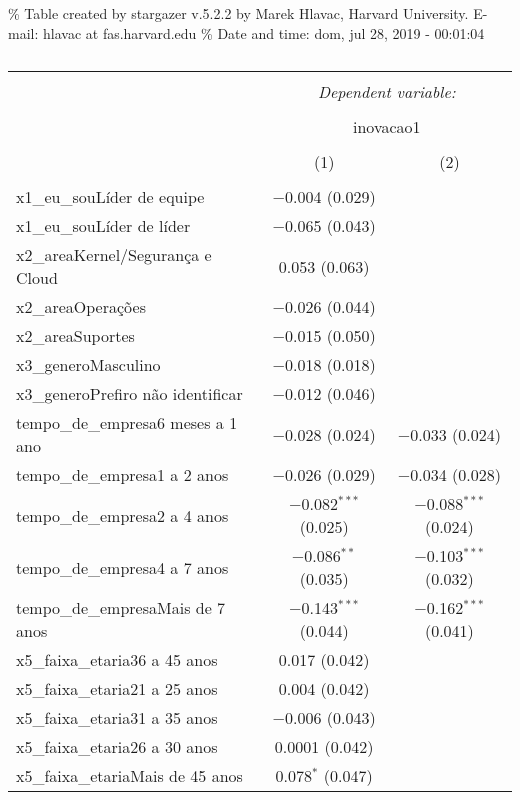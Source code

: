 \documentclass[]{book}
\begin{document}
\% Table created by stargazer v.5.2.2 by Marek Hlavac, Harvard University. E-mail: hlavac at fas.harvard.edu
\% Date and time: dom, jul 28, 2019 - 00:01:04

\begin{table}[!htbp] \centering 
  \caption{} 
  \label{} 
\begin{tabular}{@{\extracolsep{5pt}}lcc} 
\\[-1.8ex]\hline 
\hline \\[-1.8ex] 
 & \multicolumn{2}{c}{\textit{Dependent variable:}} \\ 
\cline{2-3} 
\\[-1.8ex] & \multicolumn{2}{c}{inovacao1} \\ 
\\[-1.8ex] & (1) & (2)\\ 
\hline \\[-1.8ex] 
 x1\_eu\_souLíder de equipe & $-$0.004 (0.029) &  \\ 
  x1\_eu\_souLíder de líder & $-$0.065 (0.043) &  \\ 
  x2\_areaKernel/Segurança e Cloud & 0.053 (0.063) &  \\ 
  x2\_areaOperações & $-$0.026 (0.044) &  \\ 
  x2\_areaSuportes & $-$0.015 (0.050) &  \\ 
  x3\_generoMasculino & $-$0.018 (0.018) &  \\ 
  x3\_generoPrefiro não identificar & $-$0.012 (0.046) &  \\ 
  tempo\_de\_empresa6 meses a 1 ano & $-$0.028 (0.024) & $-$0.033 (0.024) \\ 
  tempo\_de\_empresa1 a 2 anos & $-$0.026 (0.029) & $-$0.034 (0.028) \\ 
  tempo\_de\_empresa2 a 4 anos & $-$0.082$^{***}$ (0.025) & $-$0.088$^{***}$ (0.024) \\ 
  tempo\_de\_empresa4 a 7 anos & $-$0.086$^{**}$ (0.035) & $-$0.103$^{***}$ (0.032) \\ 
  tempo\_de\_empresaMais de 7 anos & $-$0.143$^{***}$ (0.044) & $-$0.162$^{***}$ (0.041) \\ 
  x5\_faixa\_etaria36 a 45 anos & 0.017 (0.042) &  \\ 
  x5\_faixa\_etaria21 a 25 anos & 0.004 (0.042) &  \\ 
  x5\_faixa\_etaria31 a 35 anos & $-$0.006 (0.043) &  \\ 
  x5\_faixa\_etaria26 a 30 anos & 0.0001 (0.042) &  \\ 
  x5\_faixa\_etariaMais de 45 anos & 0.078$^{*}$ (0.047) &  \\ 

\end{tabular}
\end{table}
\end{document}
